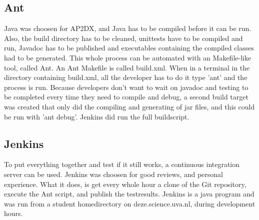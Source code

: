 \documentclass[titlepage, a4paper,10pt]{article}
\begin{document}
\subsection{Ant}
Java was choosen for AP2DX, and Java has to be compiled before it can be run. Also, the build directory has to be cleaned, unittests have to be compiled and run, Javadoc has to be published and executables containing the compiled classes had to be generated. This whole process can be automated with an Makefile-like tool, called Ant. An Ant Makefile is called build.xml. When in a terminal in the directory containing build.xml, all the developer has to do it type 'ant' and the process is run. Because developers don't want to wait on javadoc and testing to be completed every time they need to compile and debug, a second build target was created that only did the compiling and generating of jar files, and this could be run with 'ant debug'. Jenkins did run the full buildscript.

\subsection{Jenkins}
To put everything together and test if it still works, a continuous integration server can be used. Jenkins was choosen for good reviews, and personal experience. What it does, is get every whole hour a clone of the Git repository, execute the Ant script, and publish the testresults. Jenkins is a java program and was run from a student homedirectory on deze.science.uva.nl, during development hours.
\end{document}
